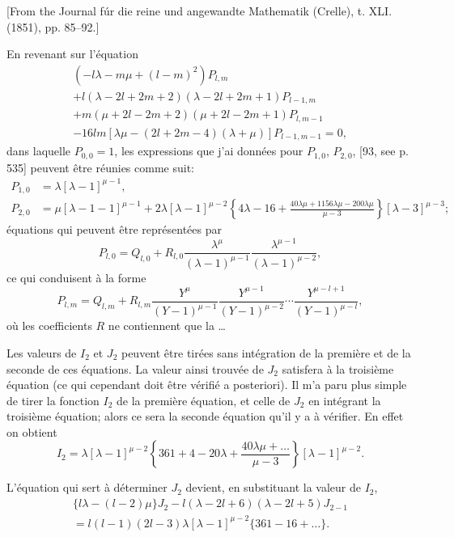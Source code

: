 \documentclass[11pt,a4paper]{book}
\begin{document}
[From the Journal f\'{u}r die reine und angewandte Mathematik (Crelle), t. XLI. (1851), pp. 85--92.]

En revenant sur l'\'{e}quation
\begin{multline*}
(-l\lambda - m\mu + (l - m)^2) P_{l,m} \\
+ l(\lambda - 2l + 2m + 2)(\lambda - 2l + 2m + 1) P_{l-1,m} \\
+ m(\mu + 2l - 2m + 2)(\mu + 2l - 2m + 1) P_{l,m-1} \\
- 16lm[\lambda\mu - (2l + 2m - 4)(\lambda + \mu)] P_{l-1,m-1} = 0,
\end{multline*}
dans laquelle $P_{0,0} = 1$, les expressions que j'ai donn\'{e}es pour $P_{1,0}$, $P_{2,0}$, [93, see p. 535] peuvent \^{e}tre r\'{e}unies comme suit:
\begin{align*}
P_{1,0} &= \lambda[\lambda - 1]^{\mu - 1}, \\
P_{2,0} &= \mu[\lambda - 1 - 1]^{\mu - 1} + 2\lambda[\lambda - 1]^{\mu - 2} \left\{4\lambda - 16 + \frac{40\lambda\mu + 1156\lambda\mu - 200\lambda\mu}{\mu - 3}\right\} [\lambda - 3]^{\mu - 3};
\end{align*}
\'{e}quations qui peuvent \^{e}tre repr\'{e}sent\'{e}es par
\[
P_{l,0} = Q_{l,0} + R_{l,0} \frac{\lambda^{\mu}}{(\lambda - 1)^{\mu - 1}} \frac{\lambda^{\mu - 1}}{(\lambda - 1)^{\mu - 2}},
\]
ce qui conduisent \`{a} la forme
\[
P_{l,m} = Q_{l,m} + R_{l,m} \frac{Y^{\mu}}{(Y - 1)^{\mu - 1}} \frac{Y^{\mu - 1}}{(Y - 1)^{\mu - 2}} \cdots \frac{Y^{\mu - l + 1}}{(Y - 1)^{\mu - l}},
\]
o\`{u} les coefficients $R$ ne contiennent que la \ldots

Les valeurs de $I_2$ et $J_2$ peuvent \^{e}tre tir\'{e}es sans int\'{e}gration de la premi\`{e}re et de la seconde de ces \'{e}quations. La valeur ainsi trouv\'{e}e de $J_2$ satisfera \`{a} la troisi\`{e}me \'{e}quation (ce qui cependant doit \^{e}tre v\'{e}rifi\'{e} a posteriori). Il m'a paru plus simple de tirer la fonction $I_2$ de la premi\`{e}re \'{e}quation, et celle de $J_2$ en int\'{e}grant la troisi\`{e}me \'{e}quation; alors ce sera la seconde \'{e}quation qu'il y a \`{a} v\'{e}rifier. En effet on obtient
\[
I_2 = \lambda[\lambda - 1]^{\mu - 2} \left\{361 + 4 - 20\lambda + \frac{40\lambda\mu + \ldots}{\mu - 3}\right\} [\lambda - 1]^{\mu - 2}.
\]

L'\'{e}quation qui sert \`{a} d\'{e}terminer $J_2$ devient, en substituant la valeur de $I_2$,
\begin{multline*}
\{l\lambda - (l - 2)\mu\} J_2 - l(\lambda - 2l + 6)(\lambda - 2l + 5) J_{2-1} \\
= l(l - 1)(2l - 3)\lambda[\lambda - 1]^{\mu - 2} \{361 - 16 + \ldots\}.
\end{multline*}
\clearpage
\end{document}
